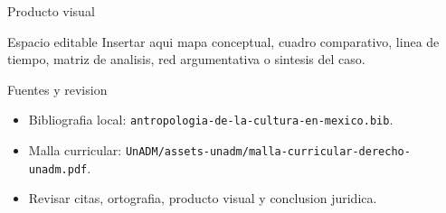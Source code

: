 \documentclass[
  spanish,
  aspectratio=169,
  xcolor={dvipsnames,table}
]{beamer}
\begin{document}
\begin{frame}{Producto visual}
  \begin{block}{Espacio editable}
    Insertar aqui mapa conceptual, cuadro comparativo, linea de tiempo,
    matriz de analisis, red argumentativa o sintesis del caso.
  \end{block}
  \centering
\end{frame}

\begin{frame}{Fuentes y revision}
  \begin{itemize}
    \item Bibliografia local: \texttt{antropologia-de-la-cultura-en-mexico.bib}.
    \item Malla curricular: \texttt{UnADM/assets-unadm/malla-curricular-derecho-unadm.pdf}.
    \item Revisar citas, ortografia, producto visual y conclusion juridica.
  \end{itemize}
\end{frame}
\end{document}
